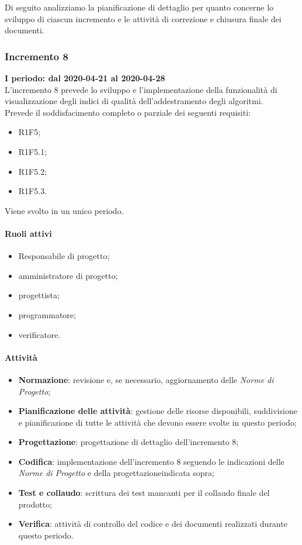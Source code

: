 Di seguito analizziamo la pianificazione di dettaglio per quanto concerne lo sviluppo di ciascun incremento e le attività di correzione e chiusura finale dei documenti.

\subsubsection{Incremento 8}
\textbf{I periodo: dal 2020-04-21 al 2020-04-28} \\
L'incremento 8 prevede lo sviluppo e l'implementazione della funzionalità di visualizzazione degli indici di qualità dell'addestramento degli algoritmi.
\\Prevede il soddisfacimento completo o parziale dei seguenti requisiti:
\begin{itemize}
	\item R1F5;
	\item R1F5.1;
	\item R1F5.2;
	\item R1F5.3.
\end{itemize}
Viene svolto in un unico periodo.
\paragraph{Ruoli attivi}
\begin{itemize}
	\item Responsabile di progetto\glo;
	\item amministratore di progetto\glo;
	\item progettista;
	\item programmatore;
	\item verificatore.
\end{itemize}
\paragraph{Attività}
\begin{itemize}
	\item \textbf{Normazione}: revisione e, se necessario, aggiornamento delle \textit{Norme di Progetto};
	\item \textbf{Pianificazione delle attività}: gestione delle risorse disponibili, suddivisione e pianificazione di tutte le attività che devono essere svolte in questo periodo;
	\item \textbf{Progettazione}: progettazione di dettaglio dell'incremento 8;
	\item \textbf{Codifica}: implementazione dell'incremento 8 seguendo le indicazioni delle \textit{Norme di Progetto} e della progettazione\glosp indicata sopra;
	\item \textbf{Test e collaudo}: scrittura dei test mancanti per il collaudo finale del prodotto\glo;
	\item \textbf{Verifica}: attività di controllo del codice e dei documenti realizzati durante questo periodo.
\end{itemize}

